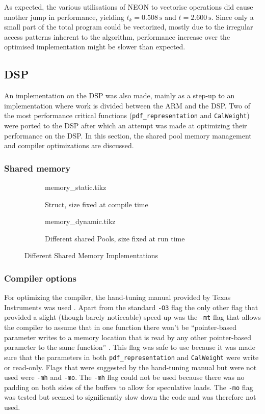 \documentclass[final]{article}
\begin{document}
As expected, the various utilisations of NEON to vectorise operations did cause another jump in performance, yielding $t_k = \SI{0.508}{\second}$ and $t = \SI{2.600}{\second}$. Since only a small part of the total program could be vectorized, mostly due to the irregular access patterns inherent to the algorithm, performance increase over the optimised implementation might be slower than expected.


\subsection{DSP}
An implementation on the DSP was also made, mainly as a step-up to an implementation where work is divided between the ARM and the DSP.
Two of the most performance critical functions (\texttt{pdf\_representation} and \texttt{CalWeight}) were ported to the DSP after which an attempt was made at optimizing their performance on the DSP.
In this section, the shared pool memory management and compiler optimizations are discussed.

\subsubsection{Shared memory}

\begin{figure}[H]
    \centering
    \begin{subfigure}[b]{0.45\linewidth}
        \centering
        {memory_static.tikz}
        \caption{Struct, size fixed at compile time}
        \label{fig:memory-static}
    \end{subfigure}
    \begin{subfigure}[b]{0.45\linewidth}
        \centering
        {memory_dynamic.tikz}
        \caption{Different shared Pools, size fixed at run time}
        \label{fig:memory-dynamic}
    \end{subfigure}
    \caption{Different Shared Memory Implementations}
    \label{fig:memory}
\end{figure}


\subsubsection{Compiler options}
For optimizing the compiler, the hand-tuning manual provided by Texas Instruments was used \cite{handtuning}.
Apart from the standard \texttt{-O3} flag the only other flag that provided a slight (though barely noticeable) speed-up was the \texttt{-mt} flag that allows the compiler to assume that in one function there won't be ``pointer-based parameter writes to a memory location that is read by any other pointer-based parameter to the same function'' \cite{handtuning}.
This flag was safe to use because it was made sure that the parameters in both \texttt{pdf\_representation} and \texttt{CalWeight} were write or read-only. Flags that were suggested by the hand-tuning manual but were not used were \texttt{-mh} and \texttt{-mo}. The \texttt{-mh} flag could not be used because there was no padding on both sides of the buffers to allow for speculative loads. The \texttt{-mo} flag was tested but seemed to significantly slow down the code and was therefore not used.
\end{document}
